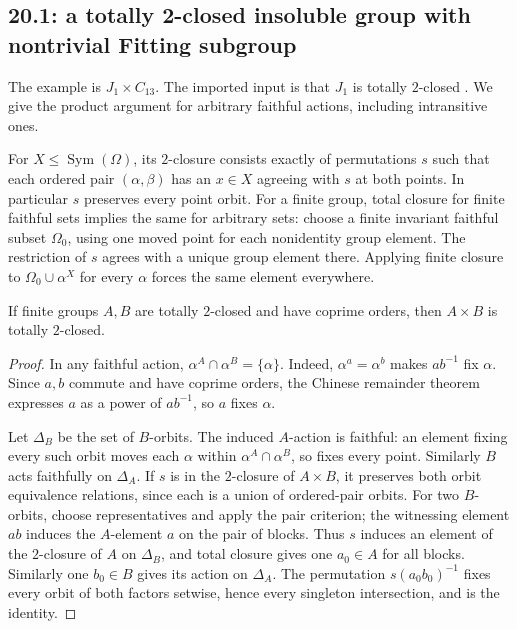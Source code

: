 \subsection{20.1: a totally 2-closed insoluble group with nontrivial Fitting subgroup}
\label{cand:20.1}
The example is \(J_1\times C_{13}\).
The imported input is that \(J_1\) is totally \(2\)-closed
\cite[Theorem~1.1 and Proposition~4.8]{totally-two-closed}.
We give the product argument for arbitrary faithful actions, including
intransitive ones.

For \(X\le\operatorname{Sym}(\Omega)\), its \(2\)-closure consists
exactly of permutations \(s\) such that each ordered pair
\((\alpha,\beta)\) has an \(x\in X\) agreeing with \(s\) at both points.
In particular \(s\) preserves every point orbit.
For a finite group, total closure for finite faithful sets implies
the same for arbitrary sets: choose a finite invariant faithful subset
\(\Omega_0\), using one moved point for each nonidentity group element.
The restriction of \(s\) agrees with a unique group element there.
Applying finite closure to \(\Omega_0\cup\alpha^X\) for every \(\alpha\)
forces the same element everywhere.

\begin{lemma}
If finite groups \(A,B\) are totally \(2\)-closed and have coprime
orders, then \(A\times B\) is totally \(2\)-closed.
\end{lemma}
\begin{proof}
In any faithful action, \(\alpha^A\cap\alpha^B=\{\alpha\}\).
Indeed, \(\alpha^a=\alpha^b\) makes \(ab^{-1}\) fix \(\alpha\).
Since \(a,b\) commute and have coprime orders, the Chinese remainder
theorem expresses \(a\) as a power of \(ab^{-1}\), so \(a\) fixes
\(\alpha\).

Let \(\Delta_B\) be the set of \(B\)-orbits. The induced \(A\)-action
is faithful: an element fixing every such orbit moves each \(\alpha\)
within \(\alpha^A\cap\alpha^B\), so fixes every point.
Similarly \(B\) acts faithfully on \(\Delta_A\).
If \(s\) is in the \(2\)-closure of \(A\times B\), it preserves both
orbit equivalence relations, since each is a union of ordered-pair
orbits. For two \(B\)-orbits, choose representatives and apply the
pair criterion; the witnessing element \(ab\) induces the \(A\)-element
\(a\) on the pair of blocks.
Thus \(s\) induces an element of the \(2\)-closure of \(A\) on
\(\Delta_B\), and total closure gives one \(a_0\in A\) for all blocks.
Similarly one \(b_0\in B\) gives its action on \(\Delta_A\).
The permutation \(s(a_0b_0)^{-1}\) fixes every orbit of both factors
setwise, hence every singleton intersection, and is the identity.
\end{proof}

